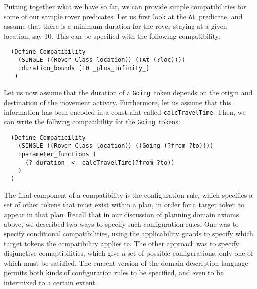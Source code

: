 Putting together what we have so far, we can provide simple
compatibilities for some of our sample rover predicates.  Let us first
look at the {\tt At}\ predicate, and assume that there is a minimum
duration for the rover staying at a given location, say 10.  This can
be specified with the following compatibility:
  \begin{verbatim}
  (Define_Compatibility
    (SINGLE ((Rover_Class location)) ((At (?loc))))
    :duration_bounds [10 _plus_infinity_]
   )  \end{verbatim}
  Let us now assume that the duration of a {\tt Going}\ token depends
on the origin and destination of the movement activity.  Furthermore,
let us assume that this information has been encoded in a constraint
called {\tt calcTravelTime}.  Then, we can write the follwing
compatibility for the {\tt Going}\ tokens:
  \begin{verbatim}
  (Define_Compatibility
    (SINGLE ((Rover_Class location)) ((Going (?from ?to))))
    :parameter_functions (
      (?_duration_ <- calcTravelTime(?from ?to))
    )
  )  \end{verbatim}





The final component of a compatibility is the configuration rule,
which specifies a set of other tokens that must exist within a plan,
in order for a target token to appear in that plan.  Recall that in
our discussion of planning domain axioms above, we described two ways
to specify such configuration rules.  One was to specify conditional
compatibilities, using the applicability guards to specify which
target tokens the compatibility applies to.  The other approach was to
specify disjunctive comaptibilities, which give a set of possible
configurations, only one of which must be satisfied.  The current
version of the domain description language permits both kinds of
configuration rules to be specified, and even to be intermixed to a
certain extent.

